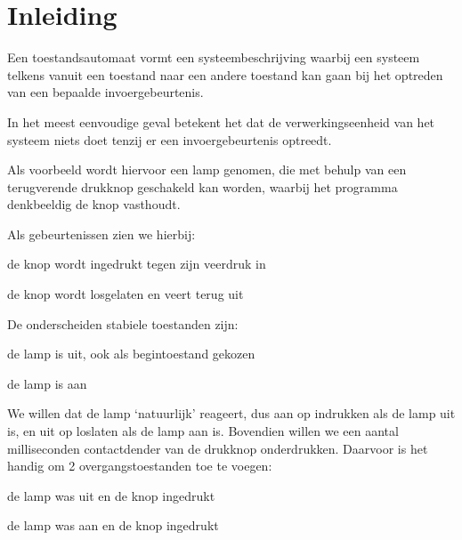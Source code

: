 \documentclass[a4paper, 11pt, fleqn, twoside]{scrartcl}%
\renewenvironment{description}[1][1em]%
 {\list{}{\labelwidth=0pt \leftmargin=#1
  \let\makelabel\descriptionlabel}}
 {\endlist}
\begin{document}
\pagestyle{RvLpagina}

\section{Inleiding}
Een toestandsautomaat vormt een systeembeschrijving waarbij een systeem
 telkens vanuit een toestand naar een andere toestand kan gaan bij het optreden
 van een bepaalde invoergebeurtenis.

In het meest eenvoudige geval betekent het dat de verwerkingseenheid van
 het systeem niets doet tenzij er een invoergebeurtenis optreedt.

Als voorbeeld wordt hiervoor een lamp genomen, die met behulp van een
 terugverende drukknop geschakeld kan worden, waarbij het programma denkbeeldig
 de knop vasthoudt.

Als gebeurtenissen zien we hierbij:
\begin{description}[1.2em]
\item[in] de knop wordt ingedrukt tegen zijn veerdruk in
\item[los] de knop wordt losgelaten en veert terug uit
\end{description}

De onderscheiden stabiele toestanden zijn:
\begin{description}
\item[uit] de lamp is uit, ook als begintoestand gekozen
\item[aan] de lamp is aan
\end{description}

We willen dat de lamp `natuurlijk' reageert, dus aan op indrukken als de lamp
 uit is, en uit op loslaten als de lamp aan is. Bovendien willen we een 
 aantal milliseconden contactdender van de drukknop onderdrukken.
 Daarvoor is het handig om 2 overgangstoestanden toe te voegen:
\begin{description}
\item[uit1] de lamp was uit en de knop ingedrukt
\item[aan1] de lamp was aan en de knop ingedrukt
\end{description}
\end{document}
